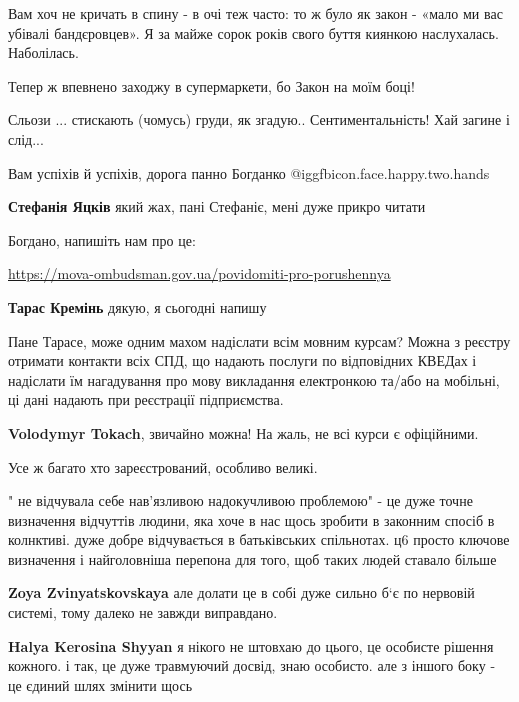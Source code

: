 \begin{itemize}
Вам хоч не кричать в спину - в очі теж часто: то ж було як закон - «мало ми вас
убівалі бандєровцев». Я за майже сорок років свого буття киянкою наслухалась.
Наболілась.

Тепер ж впевнено заходжу в супермаркети, бо Закон на моїм боці!

Сльози ... стискають (чомусь) груди, як згадую.. Сентиментальність! Хай загине і слід...

Вам успіхів й успіхів, дорога панно Богданко @igg{fbicon.face.happy.two.hands} 

\begin{itemize} %
\textbf{Стефанія Яцків} який жах, пані Стефаніє, мені дуже прикро читати
\end{itemize} %

Богдано, напишіть нам про це:\par 
\url{https://mova-ombudsman.gov.ua/povidomiti-pro-porushennya}

\begin{itemize} %
\textbf{Тарас Кремінь} дякую, я сьогодні напишу

Пане Тарасе, може одним махом надіслати всім мовним курсам?
Можна з реєстру отримати контакти всіх СПД, що надають послуги по відповідних КВЕДах і надіслати їм нагадування про мову викладання електронкою та/або на мобільні, ці дані надають при реєстрації підприємства.

\textbf{Volodymyr Tokach}, звичайно можна! На жаль, не всі курси є офіційними.

Усе ж багато хто зареєстрований, особливо великі.
\end{itemize} %


" не відчувала себе нав’язливою надокучливою проблемою" - це дуже точне
визначення відчуттів людини, яка хоче в нас щось зробити в законним спосіб в
колнктиві. дуже добре відчувається в батьківських спільнотах. ц6 просто ключове
визначення і найголовніша перепона для того, щоб таких людей ставало більше

\begin{itemize} %
\textbf{Zoya Zvinyatskovskaya} але долати це в собі дуже сильно б‘є по нервовій системі, тому далеко не завжди виправдано.


\textbf{Halya Kerosina Shyyan} я нікого не штовхаю до цього, це особисте рішення кожного. і так, це дуже травмуючий досвід, знаю особисто. але з іншого боку - це єдиний шлях змінити щось


\end{itemize}
\end{itemize}
